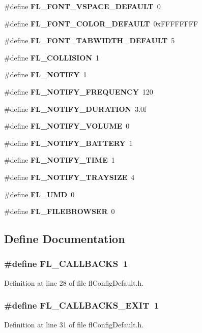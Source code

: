 \begin{CompactItemize}
\#define {\bf FL\_\-FONT\_\-VSPACE\_\-DEFAULT}~0
\item 
\#define {\bf FL\_\-FONT\_\-COLOR\_\-DEFAULT}~0x\-FFFFFFFF
\item 
\#define {\bf FL\_\-FONT\_\-TABWIDTH\_\-DEFAULT}~5
\item 
\#define {\bf FL\_\-COLLISION}~1
\item 
\#define {\bf FL\_\-NOTIFY}~1
\item 
\#define {\bf FL\_\-NOTIFY\_\-FREQUENCY}~120
\item 
\#define {\bf FL\_\-NOTIFY\_\-DURATION}~3.0f
\item 
\#define {\bf FL\_\-NOTIFY\_\-VOLUME}~0
\item 
\#define {\bf FL\_\-NOTIFY\_\-BATTERY}~1
\item 
\#define {\bf FL\_\-NOTIFY\_\-TIME}~1
\item 
\#define {\bf FL\_\-NOTIFY\_\-TRAYSIZE}~4
\item 
\#define {\bf FL\_\-UMD}~0
\item 
\#define {\bf FL\_\-FILEBROWSER}~0
\end{CompactItemize}


\subsection{Define Documentation}
\subsubsection{\setlength{\rightskip}{0pt plus 5cm}\#define FL\_\-CALLBACKS~1}\label{flConfigDefault_8h_99bd249457df41b31e2c2b4ed4e88d33}




Definition at line 28 of file fl\-Config\-Default.h.
\subsubsection{\setlength{\rightskip}{0pt plus 5cm}\#define FL\_\-CALLBACKS\_\-EXIT~1}\label{flConfigDefault_8h_f8fdf74f16064484dfb0aa5dd50e1733}




Definition at line 31 of file fl\-Config\-Default.h.
